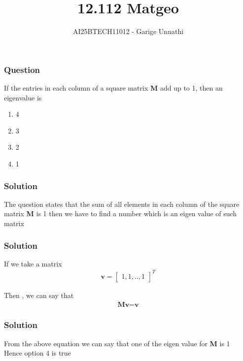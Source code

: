 \documentclass{beamer}
\title{12.112 Matgeo}
\author{AI25BTECH11012 - Garige Unnathi}
\date{}
\begin{document}
\frame{\titlepage}

\begin{frame}
\frametitle{Question}
If the entries in each column of a square matrix \textbf{M} add up to 1, then an eigenvalue is
\begin{enumerate}
    \item 4
    \item 3
    \item 2
    \item 1
\end{enumerate}
\end{frame}


\begin{frame}
\frametitle{Solution}
The question states that the sum of all elements in each column of the square matrix \textbf{M} is 1 then we have to find a number which is an eigen value of such matrix 
\end{frame}



\begin{frame}
\frametitle{Solution}
If we take a matrix \\
\begin{align}
    \textbf{v} = \begin{bmatrix}1,1,..,1\end{bmatrix}^T
\end{align}

Then , we can say that 
\begin{align}
    \textbf{M}\textbf{v} = \textbf{v}
\end{align}
\end{frame}

\begin{frame}
\frametitle{Solution}
From the above equation we can say that one of the eigen value for \textbf{M} is 1\\
Hence option 4 is true

\end{frame}
\end{document}
